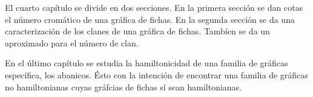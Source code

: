 El cuarto cap\'itulo se  divide en dos secciones. En la primera secci\'on se dan
cotas el n\'umero crom\'atico de una gr\'afica de fichas. En la segunda
secci\'on se da una caracterizaci\'on de los clanes de una gr\'afica de fichas.
Tamb\'ien se da un aproximado para el n\'umero de clan.

En el \'ultimo cap\'itulo se estudia la hamiltonicidad de una familia de
gr\'aficas espec\'ifica, los abanicos. \'Esto con la intenci\'on de encontrar
una familia de gr\'aficas no hamiltonianas cuyas gr\'afcias de fichas s\'i sean
hamiltonianas.